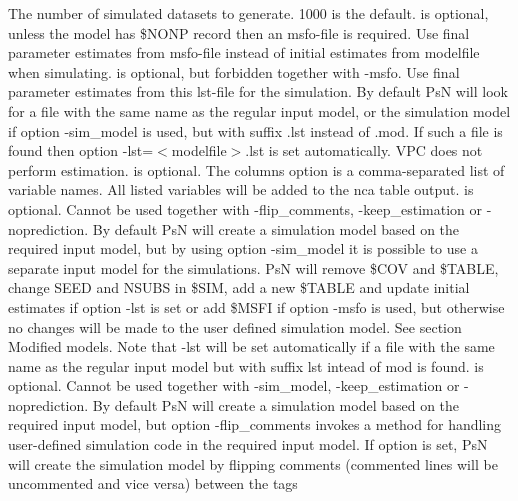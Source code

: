 \begin{optionlist}
The number of simulated datasets to generate. 1000 is the default. 
\nextopt
{}
is optional, unless the model has \$NONP record then an msfo-file	is required. Use final parameter estimates from msfo-file instead of initial estimates from modelfile when simulating.
\nextopt
{}
is optional, but forbidden together with -msfo. Use final parameter estimates from this lst-file for the simulation. By default PsN will look for a file with the same name as the regular input model, or the simulation model if option -sim\_model is used, but with suffix .lst instead of .mod. If such a file is found then option -lst=$<$modelfile$>$.lst is set automatically. VPC does not perform estimation. 
\nextopt
{}
is optional. The columns option is a comma-separated list of variable names. All listed variables will be added to the nca table output.
\nextopt
{}
is optional. Cannot be used together with -flip\_comments, -keep\_estimation or -noprediction. By default PsN will create a simulation model based on the  required input model, but by using option -sim\_model it is possible to use a separate input model for the simulations. PsN will remove \$COV and \$TABLE, change SEED and NSUBS in \$SIM, add a new \$TABLE and  update initial estimates if option -lst is set or add \$MSFI if option -msfo is used, but otherwise no changes will be made to the user defined simulation model. See section Modified models. Note that -lst will be set automatically if a file with the same name as the regular input model but with suffix lst intead of mod is found. 
\nextopt
{}
is optional. Cannot be used together with -sim\_model, -keep\_estimation or -noprediction. By default PsN will create a simulation model based on the  required input model, but option -flip\_comments invokes a method for handling user-defined simulation code in the required input model. If option is set, PsN will create the simulation model by flipping comments (commented lines will be uncommented and vice versa) between the tags



\end{optionlist}
